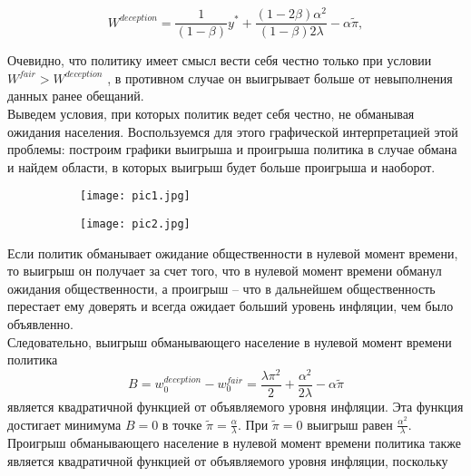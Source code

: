 \begin{equation}
W^{deception} = \frac{1}{(1-\beta)}y^*+\frac{(1-2\beta)\alpha^2}{(1-\beta)2\lambda}-\alpha\tilde{\pi},
\end{equation}

Очевидно, что политику имеет смысл вести себя честно только при условии $W^{fair} > W^{deception}$ , в противном случае он выигрывает больше от невыполнения данных ранее обещаний.
\\

Выведем условия, при которых политик ведет себя честно, не обманывая ожидания населения. Воспользуемся для этого графической интерпретацией этой проблемы: построим графики выигрыша и проигрыша политика в случае обмана и найдем области, в которых выигрыш будет больше проигрыша и наоборот.

\begin{figure}[h]
	
	\begin{subfigure}{0.5\textwidth}
		\texttt{[image: pic1.jpg]} 
		\caption{}
		\label{fig:pic1}
	\end{subfigure}
	\begin{subfigure}{0.5\textwidth}
		\texttt{[image: pic2.jpg]}
		\caption{}
		\label{fig:pic2}
	\end{subfigure}
	
	\caption{}
	\label{fig:image2}
\end{figure}

Если политик обманывает ожидание общественности в нулевой момент времени, то выигрыш он получает за счет того, что в нулевой момент времени обманул ожидания общественности, а проигрыш – что в дальнейшем общественность перестает ему доверять и всегда ожидает больший уровень инфляции, чем было объявленно.
\\

Следовательно, выигрыш обманывающего население в нулевой момент времени политика
\begin{equation}
B=w^{deception}_0 - w^{fair}_0 = \frac{\lambda\pi^2}{2}+\frac{\alpha^2}{2\lambda}-\alpha\tilde{\pi}
\end{equation}
является квадратичной функцией от объявляемого уровня инфляции. Эта функция достигает минимума $B=0$  в точке $\tilde{\pi}=\frac{\alpha}{\lambda}$. При $\tilde{\pi}=0$  выигрыш равен $\frac{\alpha^2}{\lambda}$.
\\

Проигрыш обманывающего население в нулевой момент времени политика также является квадратичной функцией от объявляемого уровня инфляции, поскольку


